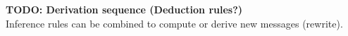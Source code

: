 \textbf{TODO: Derivation sequence (Deduction rules?)} \\
Inference rules can be combined to compute or derive new messages (rewrite). 
 



